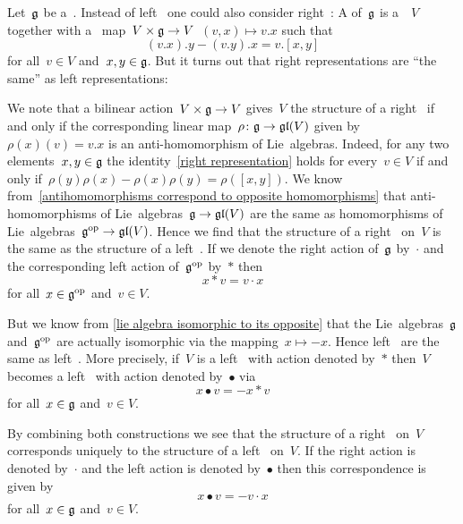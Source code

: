 \begin{remark}
  \label{right representations}
  Let~$\glie$ be a~{\liealgebra{$\kf$}}.
  Instead of left~{\representations{$\glie$}} one could also consider right~{\representations{$\glie$}}:
  A  of~$\glie$ is a~{\vectorspace{$\kf$}}~$V$ together with a~{\bilinear{$\kf$}} map~$V \times \mathfrak{g} \to V$~$(v,x) \mapsto v.x$ such that
  \begin{equation}
    \label{right representation}
    (v.x).y - (v.y).x
    =
    v.[x,y]
  \end{equation}
  for all~$v \in V$ and~$x, y \in \mathfrak{g}$.
  But it turns out that right representations are \enquote{the same} as left representations:
  
  We note that a bilinear action~$V \times \mathfrak{g} \to V$ gives~$V$ the structure of a right~{\representations{$\glie$}} if and only if the corresponding linear map~$\rho \colon \mathfrak{g} \to \mathfrak{gl}(V)$ given by~$\rho(x)(v) = v.x$ is an anti-homomorphism of Lie~algebras.
  Indeed, for any two elements~$x, y \in \mathfrak{g}$ the identity~\eqref{right representation} holds for every~$v \in V$ if and only if~$\rho(y)\rho(x) - \rho(x) \rho(y) = \rho([x,y])$.
  We know from~\cref{antihomomorphisms correspond to opposite homomorphisms} that anti-homomorphisms of Lie~algebras~$\mathfrak{g} \to \mathfrak{gl}(V)$ are the same as homomorphisms of Lie~algebras~$\mathfrak{g}^{\mathrm{op}} \to \mathfrak{gl}(V)$.
  Hence we find that the structure of a right~{\representation{$\glie$}} on~$V$ is the same as the structure of a left~{\representation{$\glie^{\op}$}}.
  If we denote the right action of~$\glie$ by~$\cdot$ and the corresponding left action of~$\glie^\op$ by~$*$ then
  \[
    x * v
    =
    v \cdot x
  \]
  for all~$x \in \mathfrak{g}^{\mathrm{op}}$ and~$v \in V$.
  
  But we know from \cref{lie algebra isomorphic to its opposite} that the Lie~algebras~$\glie$ and~$\glie^{\op}$ are actually isomorphic via the mapping~$x \mapsto -x$.
  Hence left~{\representations{$\glie^{\op}$}} are the same as left~{\representations{$\glie$}}.
  More precisely, if~$V$ is a left~{\representation{$\glie^\op$}} with action denoted by~$*$ then~$V$ becomes a left~{\representation{$\glie$}} with action denoted by~$\bullet$ via
  \[
    x \bullet v
    =
    -x * v
  \]
  for all~$x \in \mathfrak{g}$ and~$v \in V$.
  
  By combining both constructions we see that the structure of a right~{\representation{$\glie$}} on~$V$ corresponds uniquely to the structure of a left~{\representation{$\glie$}} on~$V$.
  If the right action is denoted by~$\cdot$ and the left action is denoted by~$\bullet$ then this correspondence is given by
  \[
    x \bullet v
    =
    -v \cdot x
  \]
  for all~$x \in \mathfrak{g}$ and~$v \in V$.
\end{remark}





